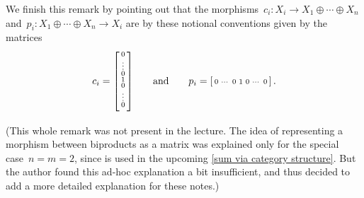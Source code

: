 \begin{remark*}
  We finish this remark by pointing out that the morphisms~$c_i \colon X_i \to X_1 \oplus \dotsb \oplus X_n$ and~$p_i \colon X_1 \oplus \dotsb \oplus X_n \to X_i$ are by these notional conventions given by the matrices
  \[
      c_i
    = \begin{bsmallmatrix}
        {} \\0 \\ \vdots \\ 0 \\ 1 \\ 0 \\ \vdots \\ 0 \\ {}
      \end{bsmallmatrix}
    \qquad\text{and}\qquad
      p_i
    = \begin{bsmallmatrix}
        0 & \cdots & 0 & 1 & 0 & \cdots & 0
      \end{bsmallmatrix} \,.
  \]
  
  (This whole remark was not present in the lecture.
  The idea of representing a morphism between biproducts as a matrix was explained only for the special case~$n = m = 2$, since is used in the upcoming \cref{sum via category structure}.
  But the author found this ad\nobreakdash-hoc explanation a bit insufficient, and thus decided to add a more detailed explanation for these notes.)
\end{remark*}


